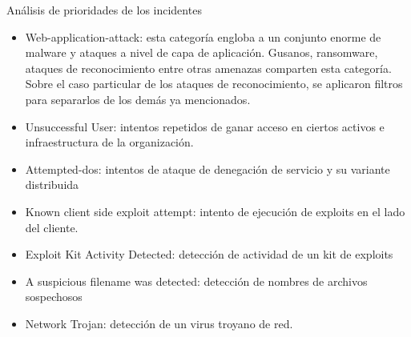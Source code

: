 \begin{section}{Análisis de prioridades de los incidentes}
    \begin{itemize}
        \item Web-application-attack: esta categoría engloba a un conjunto enorme de malware y ataques a nivel de capa de aplicación. Gusanos, ransomware, ataques de reconocimiento entre otras amenazas comparten esta categoría. Sobre el caso particular de los ataques de reconocimiento, se aplicaron filtros para separarlos de los demás ya mencionados. 
        \item Unsuccessful User: intentos repetidos de ganar acceso en ciertos activos e infraestructura de la organización.
        \item Attempted-dos: intentos de ataque de denegación de servicio y su variante distribuida
        \item Known client side exploit attempt: intento de ejecución de exploits en el lado del cliente.
        \item Exploit Kit Activity Detected: detección de actividad de un kit de exploits
        \item A suspicious filename was detected: detección de nombres de archivos sospechosos
        \item Network Trojan: detección de un virus troyano de red.
    \end{itemize}
    \end{section}